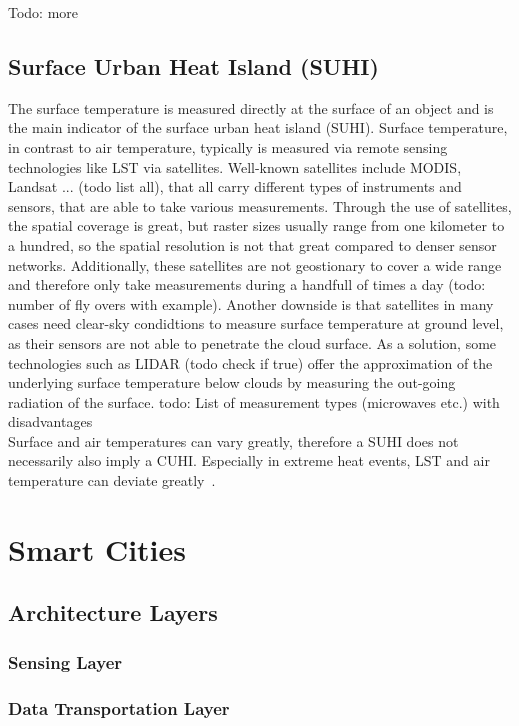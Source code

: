Todo: more

\subsection{Surface Urban Heat Island (SUHI)}

The surface temperature is measured directly at the surface of an object and is the main indicator of the surface urban heat island (SUHI). Surface temperature, in contrast to air temperature, typically is measured via remote sensing technologies like LST via satellites. Well-known satellites include MODIS, Landsat ... (todo list all), that all carry different types of instruments and sensors, that are able to take various measurements. Through the use of satellites, the spatial coverage is great, but raster sizes usually range from one kilometer to a hundred, so the spatial resolution is not that great compared to denser sensor networks. Additionally, these satellites are not geostionary to cover a wide range and therefore only take measurements during a handfull of times a day (todo: number of fly overs with example). Another downside is that satellites in many cases need clear-sky condidtions to measure surface temperature at ground level, as their sensors are not able to penetrate the cloud surface. As a solution, some technologies such as LIDAR (todo check if true) offer the approximation of the underlying surface temperature below clouds by measuring the out-going radiation of the surface.
todo: List of measurement types (microwaves etc.) with disadvantages\\
Surface and air temperatures can vary greatly, therefore a SUHI does not necessarily also imply a CUHI. Especially in extreme heat events, LST and air temperature can deviate greatly~\cite{good2016situ}.

\section{Smart Cities}

\subsection{Architecture Layers}

\subsubsection{Sensing Layer}

\subsubsection{Data Transportation Layer}

